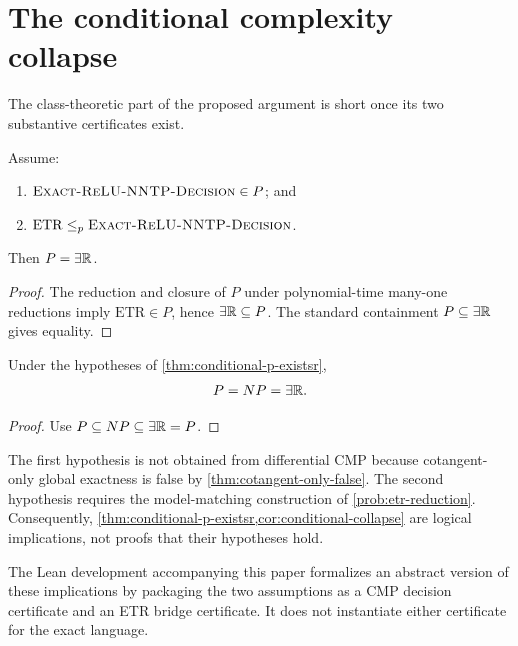 \section{The conditional complexity collapse}
\label{sec:collapse}

The class-theoretic part of the proposed argument is short once its two
substantive certificates exist.

\begin{theorem}[Conditional \(P=\ExistsR\)]
\label{thm:conditional-p-existsr}
Assume:
\begin{enumerate}
  \item \(\textnormal{\textsc{Exact-ReLU-NNTP-Decision}}\in P\); and
  \item \(\mathrm{ETR}\le_p\textnormal{\textsc{Exact-ReLU-NNTP-Decision}}\).
\end{enumerate}
Then \(P=\ExistsR\).
\end{theorem}

\begin{proof}
The reduction and closure of \(P\) under polynomial-time many-one reductions
imply \(\mathrm{ETR}\in P\), hence \(\exists\mathbb{R}\subseteq P\).  The standard
containment \(P\subseteq\exists\mathbb{R}\) gives equality.
\end{proof}

\begin{corollary}[Conditional \(P=NP=\ExistsR\)]
\label{cor:conditional-collapse}
Under the hypotheses of \cref{thm:conditional-p-existsr},
\begin{equation}
  P=NP=\exists\mathbb{R}.
\end{equation}
\end{corollary}

\begin{proof}
Use \(P\subseteq NP\subseteq\exists\mathbb{R}=P\).
\end{proof}

\begin{remark}
The first hypothesis is not obtained from differential CMP because
cotangent-only global exactness is false by
\cref{thm:cotangent-only-false}.  The second hypothesis requires the
model-matching construction of \cref{prob:etr-reduction}.  Consequently,
\cref{thm:conditional-p-existsr,cor:conditional-collapse} are logical
implications, not proofs that their hypotheses hold.
\end{remark}

The Lean development accompanying this paper formalizes an abstract version of
these implications by packaging the two assumptions as a CMP decision
certificate and an ETR bridge certificate.  It does not instantiate either
certificate for the exact language.

